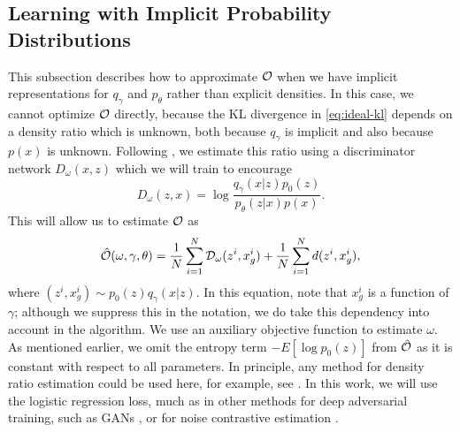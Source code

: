 \documentclass{article}
\newcommand{\Exp}[1]{{E}\left[ #1 \right]}
\begin{document}
\subsection{Learning with Implicit Probability Distributions}

This subsection describes how to approximate $\mathcal{O}$ when we have implicit representations
for $q_\gamma$ and $p_\theta$ rather than explicit densities. 
In this case, we cannot optimize $\mathcal{O}$ directly, because 
the KL divergence in \eqref{eq:ideal-kl} depends on a density ratio which is unknown, both
because $q_\gamma$ is implicit and also because $p(x)$ is unknown. Following \cite{ali2016,donahue2016adversarial}, we estimate
this ratio using a discriminator network $D_\omega(x,z)$ 
which we will train to encourage
\begin{equation}
\label{eq:d_opt}
D_{\omega}(z,x) = \log \frac{q_\gamma(x|z)p_0(z)}{p_{\theta}(z | x) p(x)}.
\end{equation}
This will allow us to estimate $\mathcal{O}$ as
\begin{align}
\label{eq:ohat}
\hat{\mathcal{O}} (\omega, \gamma, \theta) = \frac{1}{N} \sum_{i=1}^N \mathcal{D}_\omega(z^i, x_g^i) + \frac{1}{N} \sum_{i=1}^N d(z^i, x_g^i),
\end{align}
where $(z^i,x_g^i) \sim p_0(z) q_\gamma(x|z)$.
In this equation, note that $x_g^i$ is a function of $\gamma$;
although we suppress this in the notation, we do take
this dependency into account in the algorithm.
We use an auxiliary objective function to estimate $\omega$.
As mentioned earlier, we omit the entropy term $-\Exp{\log p_0(z)}$ from
$\hat{\mathcal{O}}$ as it is constant with respect to all parameters.
In principle, any method for density ratio estimation could be used here,
for example, see \cite{sugiyama:book,Gutmann2011b}. In this work, we will use the logistic regression loss, much as in other methods for deep adversarial training, such as GANs \cite{gan}, or for noise contrastive estimation \cite{gutmann12}.
\end{document}
